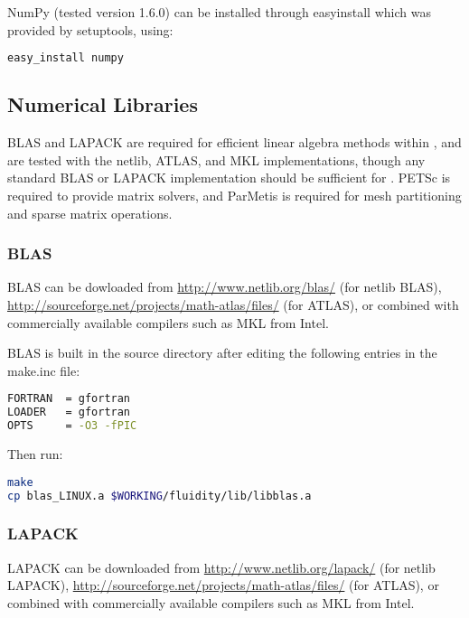 NumPy (tested version 1.6.0) can be installed through
easy{\textunderscore}install which was provided by setuptools, using:

\begin{lstlisting}[language=bash]
easy_install numpy
\end{lstlisting}

\subsection{Numerical Libraries}
\label{sec:required_libraries_numerical}

BLAS and LAPACK are required for efficient linear algebra methods within
\fluidity, and are tested with the netlib, ATLAS, and MKL implementations, though
any standard BLAS or LAPACK implementation should be sufficient for \fluidity.
PETSc is required to provide matrix solvers, and ParMetis is required for mesh
partitioning and sparse matrix operations.

\subsubsection{BLAS}
\label{sec:required_libraries_numerical_blas}

BLAS can be dowloaded from \url{http://www.netlib.org/blas/} (for netlib BLAS),
\url{http://sourceforge.net/projects/math-atlas/files/} (for ATLAS), or
combined with commercially available compilers such as MKL from Intel.

BLAS is built in the source directory after editing the following entries in
the make.inc file:

\begin{lstlisting}[language=bash]
FORTRAN  = gfortran
LOADER   = gfortran
OPTS     = -O3 -fPIC
\end{lstlisting}

Then run:

\begin{lstlisting}[language=bash]
make
cp blas_LINUX.a $WORKING/fluidity/lib/libblas.a
\end{lstlisting}

\subsubsection{LAPACK}
\label{sec:required_libraries_numerical_lapack}

LAPACK can be downloaded from \url{http://www.netlib.org/lapack/} (for netlib
LAPACK), \url{http://sourceforge.net/projects/math-atlas/files/} (for ATLAS),
or combined with commercially available compilers such as MKL from Intel. 

